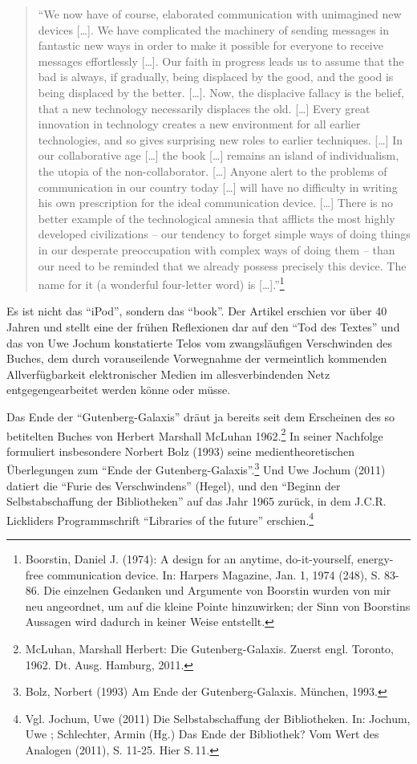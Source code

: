 \documentclass[a4paper,
fontsize=11pt,
oneside,
numbers=noperiodatend,
parskip=half-,
bibliography=totoc,
final
]{scrartcl}
\begin{document}
\begin{quote}
\enquote{We now have of course, elaborated communication with unimagined
new devices {[}\ldots{}{]}. We have complicated the machinery of sending
messages in fantastic new ways in order to make it possible for everyone
to receive messages effortlessly {[}\ldots{}{]}. Our faith in progress
leads us to assume that the bad is always, if gradually, being displaced
by the good, and the good is being displaced by the better.
{[}\ldots{}{]}. Now, the displacive fallacy is the belief, that a new
technology necessarily displaces the old. {[}\ldots{}{]} Every great
innovation in technology creates a new environment for all earlier
technologies, and so gives surprising new roles to earlier techniques.
{[}\ldots{}{]} In our collaborative age {[}\ldots{}{]} the book
{[}\ldots{}{]} remains an island of individualism, the utopia of the
non-collaborator. {[}\ldots{}{]} Anyone alert to the problems of
communication in our country today {[}\ldots{}{]} will have no
difficulty in writing his own prescription for the ideal communication
device. {[}\ldots{}{]} There is no better example of the technological
amnesia that afflicts the most highly developed civilizations -- our
tendency to forget simple ways of doing things in our desperate
preoccupation with complex ways of doing them -- than our need to be
reminded that we already possess precisely this device. The name for it
(a wonderful four-letter word) is {[}\ldots{}{]}.}\footnote{Boorstin,
  Daniel J. (1974): A design for an anytime, do-it-yourself, energy-free
  communication device. In: Harpers Magazine, Jan. 1, 1974 (248), S.
  83-86. Die einzelnen Gedanken und Argumente von Boorstin wurden von
  mir neu angeordnet, um auf die kleine Pointe hinzuwirken; der Sinn von
  Boorstins Aussagen wird dadurch in keiner Weise entstellt.}
\end{quote}

Es ist nicht das \enquote{iPod}, sondern das \enquote{book}. Der Artikel
erschien vor über 40 Jahren und stellt eine der frühen Reflexionen dar
auf den \enquote{Tod des Textes} und das von Uwe Jochum konstatierte
Telos vom zwangsläufigen Verschwinden des Buches, dem durch
vorauseilende Vorwegnahme der vermeintlich kommenden Allverfügbarkeit
elektronischer Medien im allesverbindenden Netz entgegengearbeitet
werden könne oder müsse.

Das Ende der \enquote{Gutenberg-Galaxis} dräut ja bereits seit dem
Erscheinen des so betitelten Buches von Herbert Marshall McLuhan
1962.\footnote{McLuhan, Marshall Herbert: Die Gutenberg-Galaxis. Zuerst
  engl. Toronto, 1962. Dt. Ausg. Hamburg, 2011.} In seiner Nachfolge
formuliert insbesondere Norbert Bolz (1993) seine medientheoretischen
Überlegungen zum \enquote{Ende der Gutenberg-Galaxis}.\footnote{Bolz,
  Norbert (1993) Am Ende der Gutenberg-Galaxis. München, 1993.} Und Uwe
Jochum (2011) datiert die \enquote{Furie des Verschwindens} (Hegel), und
den \enquote{Beginn der Selbstabschaffung der Bibliotheken} auf das Jahr
1965 zurück, in dem J.C.R. Lickliders Programmschrift \enquote{Libraries
of the future} erschien.\footnote{Vgl. Jochum, Uwe (2011) Die
  Selbstabschaffung der Bibliotheken. In: Jochum, Uwe ; Schlechter,
  Armin (Hg.) Das Ende der Bibliothek? Vom Wert des Analogen (2011), S.
  11-25. Hier S.\,11.}
\end{document}
